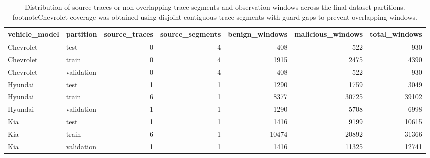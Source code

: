 \begin{table}[t]
\centering
\caption{Distribution of source traces or non-overlapping trace segments and observation windows across the final dataset partitions.\\footnote{Chevrolet coverage was obtained using disjoint contiguous trace segments with guard gaps to prevent overlapping windows.}}
\begin{tabular}{llrrrrr}
\toprule
vehicle_model & partition & source_traces & source_segments & benign_windows & malicious_windows & total_windows \\
\midrule
Chevrolet & test & 0 & 4 & 408 & 522 & 930 \\
Chevrolet & train & 0 & 4 & 1915 & 2475 & 4390 \\
Chevrolet & validation & 0 & 4 & 408 & 522 & 930 \\
Hyundai & test & 1 & 1 & 1290 & 1759 & 3049 \\
Hyundai & train & 6 & 1 & 8377 & 30725 & 39102 \\
Hyundai & validation & 1 & 1 & 1290 & 5708 & 6998 \\
Kia & test & 1 & 1 & 1416 & 9199 & 10615 \\
Kia & train & 6 & 1 & 10474 & 20892 & 31366 \\
Kia & validation & 1 & 1 & 1416 & 11325 & 12741 \\
\bottomrule
\end{tabular}

\end{table}
